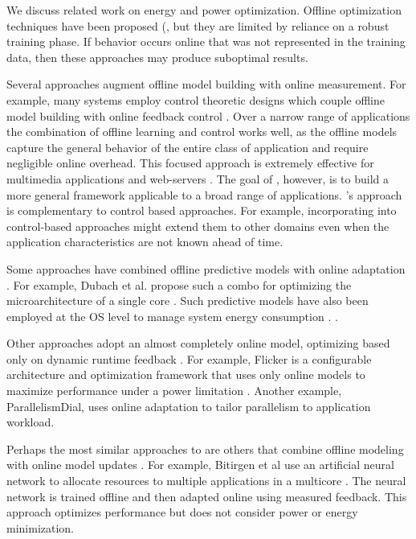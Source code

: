 \label{sec:related}
We discuss related work on energy and power optimization. Offline optimization techniques have been proposed (\eg \cite{Yi2003,LeeBrooks2006,CPR,ChenJohn2011,petabricksStatic}, but
they are limited by reliance on a robust training phase.  If behavior
occurs online that was not represented in the training data, then
these approaches may produce suboptimal results.

Several approaches augment offline model building with online
measurement.  For example, many systems employ control theoretic
designs which couple offline model building with online feedback
control
\cite{Wu2004,TCST,Chen2011,PTRADE,Heartbeats2,ControlWare,Agilos,Rajkumar,Sojka,Raghavendra2008}.
Over a narrow range of applications the combination of offline
learning and control works well, as the offline models capture the
general behavior of the entire class of application and require
negligible online overhead.  This focused approach is extremely
effective for multimedia applications
\cite{grace2,flinn99,flinn2004,xtune,TCST} and web-servers
\cite{Horvarth,LuEtAl-2006a,SunDaiPan-2008a}.  The goal of \SYSTEMLEO{},
however, is to build a more general framework applicable to a broad
range of applications.  \SYSTEMLEO{}'s approach is complementary to
control based approaches.  For example, incorporating \SYSTEMLEO{} into
control-based approaches might extend them to other domains even when
the application characteristics are not known ahead of time.

Some approaches have combined offline predictive models with online
adaptation
\cite{Zhang2012,packandcap,Winter2010,dubach2010,Koala,Cinder, wu2012inferred}.  For
example, Dubach et al.  propose such a combo for optimizing the
microarchitecture of a single core \cite{dubach2010}.  Such predictive
models have also been employed at the OS level to manage system energy
consumption \cite{Koala,Cinder}. \cite{wu2012inferred}.

Other approaches adopt an almost completely online model, optimizing
based only on dynamic runtime feedback
\cite{Li2006,Flicker,ParallelismDial,Ponamarev,petabricksDynamic,LeeBrooks}.
For example, Flicker is a configurable architecture and optimization
framework that uses only online models to maximize performance under a
power limitation \cite{Flicker}.  Another example, ParallelismDial,
uses online adaptation to tailor parallelism to application workload.


Perhaps the most similar approaches to \SYSTEMLEO{} are others that
combine offline modeling with online model updates
\cite{ICSE2014,Bitirgen2008,Ipek}.  For example, Bitirgen et al use an
artificial neural network to allocate resources to multiple
applications in a multicore \cite{Bitirgen2008}.  The neural network
is trained offline and then adapted online using measured feedback.
This approach optimizes performance but does not consider power or
energy minimization.

